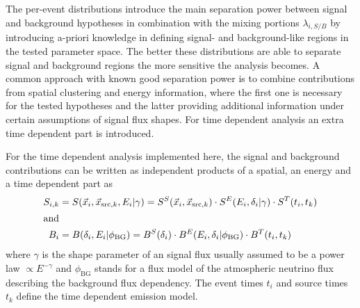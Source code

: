 The per-event distributions introduce the main separation power between signal and background hypotheses in combination with the mixing portions $\lambda_{i,S/B}$ by introducing a-priori knowledge in defining signal- and background-like regions in the tested parameter space.
The better these distributions are able to separate signal and background regions the more sensitive the analysis becomes.
A common approach with known good separation power is to combine contributions from spatial clustering and energy information, where the first one is necessary for the tested hypotheses and the latter providing additional information under certain assumptions of signal flux shapes.
For time dependent analysis an extra time dependent part is introduced.

For the time dependent analysis implemented here, the signal and background contributions can be written as independent products of a spatial, an energy and a time dependent part as
\begin{align}
  S_{i,k}
    &= S(\vec{x}_i, \vec{x}_{\mathrm{src},k}, E_i | \gamma)
     = S^S(\vec{x}_i, \vec{x}_{\mathrm{src},k}) \cdot
       S^E(E_i, \delta_i | \gamma) \cdot
       S^T(t_i, t_k) \\
  \intertext{and}
  B_i
    &= B(\delta_i, E_i | \phi_\mathrm{BG})
     = B^S(\delta_i) \cdot
       B^E(E_i, \delta_i | \phi_\mathrm{BG}) \cdot
       B^T(t_i, t_k)
\end{align}
where $\gamma$ is the shape parameter of an signal flux usually assumed to be a power law $\propto E^{-\gamma}$ and $\phi_\mathrm{BG}$ stands for a flux model of the atmospheric neutrino flux describing the background flux dependency.
The event times $t_i$ and source times $t_k$ define the time dependent emission model.

